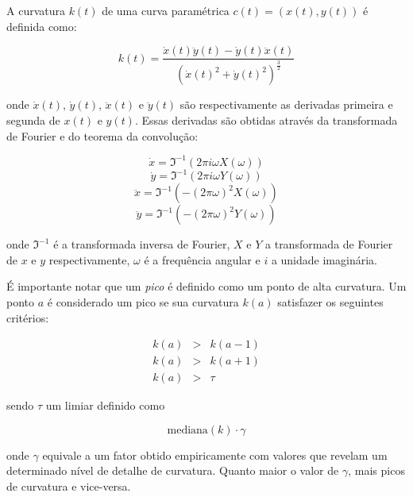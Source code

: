 A curvatura $k(t)$ de uma curva paramétrica $c(t) = (x(t), y(t))$ é definida como:

\begin{equation}
k(t) = \frac{\dot{x}(t)\ddot{y}(t)-\dot{y}(t)\ddot{x}(t)} {(\dot{x}(t)^2+\dot{y}(t)^2)^\frac{3}{2}}
\end{equation}

\noindent onde $\dot{x}(t)$, $\dot{y}(t)$, $\ddot{x}(t)$ e $\ddot{y}(t)$ são
respectivamente as derivadas primeira e segunda de $x(t)$ e $y(t)$. Essas
derivadas são obtidas através da transformada de Fourier e do teorema da
convolução:

\begin{equation}
\dot{x} = \Im^{-1}(2\pi i \omega X(\omega))
\end{equation}
\begin{equation}
\dot{y} = \Im^{-1}(2\pi i \omega Y(\omega))
\end{equation}
\begin{equation}
\ddot{x} = \Im^{-1}(-(2\pi\omega)^2 X(\omega))
\end{equation}
\begin{equation}
\ddot{y} = \Im^{-1}(-(2\pi\omega)^2 Y(\omega))
\end{equation}

\noindent onde $\Im^{-1}$ é a transformada inversa de Fourier, $X$ e $Y$ a
transformada de Fourier de $x$ e $y$ respectivamente, $\omega$ é a frequência angular
e $i$ a unidade imaginária.

É importante notar que um \emph{pico} é definido como um ponto de alta
curvatura. Um ponto $a$ é considerado um pico se sua curvatura $k(a)$ satisfazer
os seguintes critérios:

\begin{eqnarray}
	k(a) & > & k(a-1) \\
	k(a) & > & k(a+1) \\
        k(a) & > & \tau
\end{eqnarray}

\noindent sendo $\tau$ um limiar definido como

\begin{equation}
	\text{mediana}\left(k\right) \cdot \gamma 
\end{equation}

\noindent onde $\gamma$ equivale a um fator obtido empiricamente com valores que
revelam um determinado nível de detalhe de curvatura. Quanto maior o valor de
$\gamma$, mais picos de curvatura e vice-versa.

